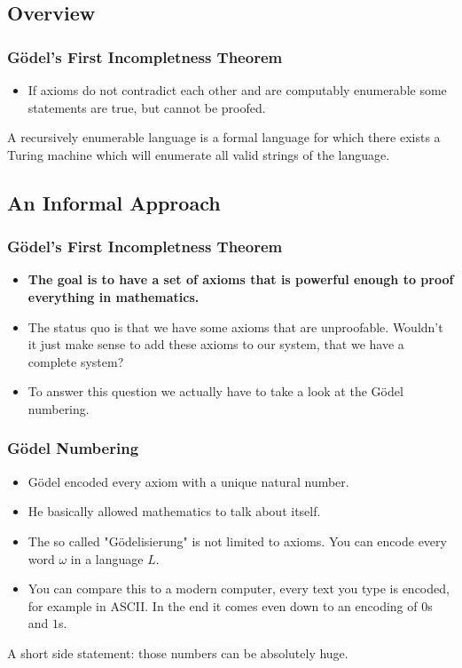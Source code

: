 \documentclass[aspectratio=169]{beamer}
\begin{document}
\subsection{Overview}
\begin{frame}
	\frametitle{Gödel's First Incompletness Theorem}
	\begin{itemize}
		\item If axioms do not contradict each other and are computably enumerable some statements are true, but cannot be proofed.
	\end{itemize}
	\begin{Definition}
	A recursively enumerable language is a formal language for which there exists a Turing machine which will enumerate all valid strings of the language.
	\end{Definition}
\end{frame}
\begin{frame}
\subsection{An Informal Approach}
	\frametitle{Gödel's First Incompletness Theorem}
	\begin{itemize}
		\item \textbf{The goal is to have a set of axioms that is powerful enough to proof everything in mathematics.}
		\item The status quo is that we have some axioms that are unproofable. Wouldn't it just make sense to add these axioms to our system, that we have a complete system?
		\item To answer this question we actually have to take a look at the Gödel numbering.
	\end{itemize}
\end{frame}
\begin{frame}
	\frametitle{Gödel Numbering}
	\begin{itemize}
		\item Gödel encoded every axiom with a unique natural number.
		\item He basically allowed mathematics to talk about itself.
		\item The so called "Gödelisierung" is not limited to axioms. You can encode every word $\omega$ in a language $L$.
		\item You can compare this to a modern computer, every text you type is encoded, for example in ASCII. In the end it comes even down to an encoding of $0$s and $1$s.
	\end{itemize}
	A short side statement: those numbers can be absolutely huge.
\end{frame}
\end{document}
